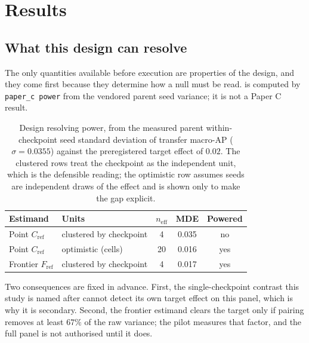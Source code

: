 \section{Results}

\begin{center}
\end{center}

\subsection{What this design can resolve}

The only quantities available before execution are properties of the design, and
they come first because they determine how a null must be read.
 is computed by \verb|paper_c power| from the vendored parent seed
variance; it is not a Paper C result.

\begin{table}[h]
\centering
\caption{Design resolving power, from the measured parent within-checkpoint seed
standard deviation of transfer macro-AP ($\sigma=0.0355$) against the
preregistered target effect of $0.02$. The clustered rows treat the checkpoint as
the independent unit, which is the defensible reading; the optimistic row assumes
seeds are independent draws of the effect and is shown only to make the gap
explicit.}
\label{tab:power}
\begin{tabular}{llccc}
\toprule
Estimand & Units & $n_{\mathrm{eff}}$ & MDE & Powered\\
\midrule
Point $C_{\mathrm{ref}}$    & clustered by checkpoint & 4  & 0.035 & no\\
Point $C_{\mathrm{ref}}$    & optimistic (cells)      & 20 & 0.016 & yes\\
Frontier $F_{\mathrm{ref}}$ & clustered by checkpoint & 4  & 0.017 & yes\\
\bottomrule
\end{tabular}
\end{table}

Two consequences are fixed in advance. First, the single-checkpoint contrast this
study is named after cannot detect its own target effect on this panel, which is
why it is secondary. Second, the frontier estimand clears the target only if
pairing removes at least $67\%$ of the raw variance; the pilot measures that
factor, and the full panel is not authorised until it does.

